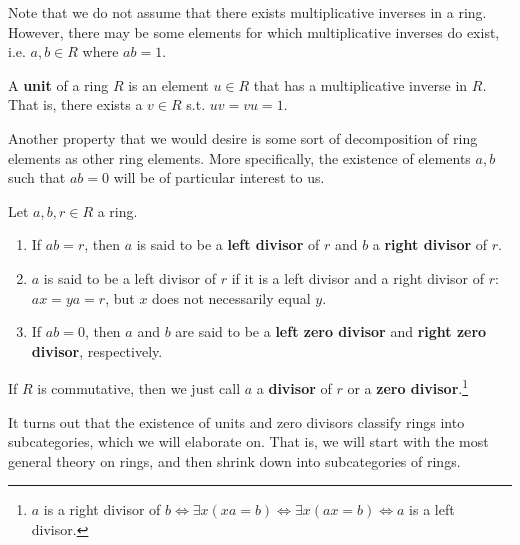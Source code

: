   Note that we do not assume that there exists multiplicative inverses in a ring. However, there may be some elements for which multiplicative inverses do exist, i.e. $a, b \in R$ where $ab = 1$.  

  \begin{definition}[Unit]
    A \textbf{unit} of a ring $R$ is an element $u \in R$ that has a multiplicative inverse in $R$. That is, there exists a $v \in R$ s.t. $uv = vu = 1$. 
  \end{definition}

  Another property that we would desire is some sort of decomposition of ring elements as other ring elements. More specifically, the existence of elements $a, b$ such that $ab = 0$ will be of particular interest to us. 

  \begin{definition}
    Let $a, b, r \in R$ a ring. 
    \begin{enumerate}
      \item If $ab = r$, then $a$ is said to be a \textbf{left divisor} of $r$ and $b$ a \textbf{right divisor} of $r$. 

      \item $a$ is said to be a left divisor of $r$ if it is a left divisor and a right divisor of $r$: $ax = ya = r$, but $x$ does not necessarily equal $y$. 

      \item If $ab = 0$, then $a$ and $b$ are said to be a \textbf{left zero divisor} and \textbf{right zero divisor}, respectively. 
    \end{enumerate}
    If $R$ is commutative, then we just call $a$ a \textbf{divisor} of $r$ or a \textbf{zero divisor}.\footnote{$a$ is a right divisor of $b \iff \exists x (xa = b) \iff \exists x (ax = b) \iff a$ is a left divisor. } 
  \end{definition}

  It turns out that the existence of units and zero divisors classify rings into subcategories, which we will elaborate on. That is, we will start with the most general theory on rings, and then shrink down into subcategories of rings. 

